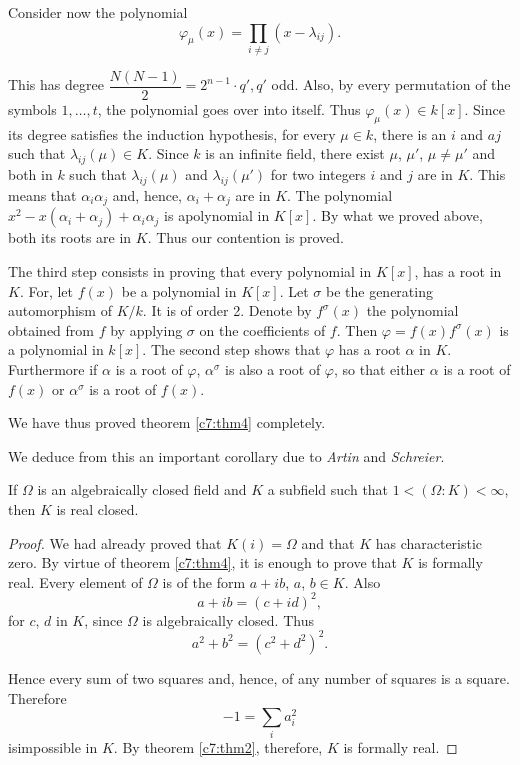 Consider now the polynomial
$$
\varphi_{\mu} (x) = \prod_{i \neq j} (x-\lambda_{ij}).
$$

This has degree $\dfrac{N(N-1)}{2} = 2^{n-1} \cdot q', q'$ odd. Also,
by every permutation of the symbols $1, \ldots, t$, the polynomial
goes over into itself. Thus $\varphi_{\mu}(x) \in k[x]$. Since its
degree satisfies the induction hypothesis, for every $\mu \in k$,
there is an $i$ and $aj$ such that $\lambda_{ij}(\mu) \in K$. Since
$k$ is an infinite field, there exist $\mu$, $\mu'$, $\mu \neq \mu'$
and both in $k$ such that $\lambda_{ij}(\mu)$ and $\lambda_{ij}(\mu')$
for two integers $i$ and $j$ are in $K$. This means that
$\alpha_i\alpha_j$ and, hence, $\alpha_i + \alpha_j$ are in $K$. The
polynomial $x^2-x(\alpha_i + \alpha_j) +\alpha_i \alpha_j$ is
a\pageoriginale polynomial in $K[x]$. By what we proved above, both
its roots are in $K$. Thus our contention is proved. 

The third step consists in proving that every polynomial in $K[x]$,
has a root in $K$. For, let $f(x)$ be a polynomial in $K[x]$. Let
$\sigma$ be the generating automorphism of $K/k$. It is of order
2. Denote by $f^{\sigma}(x)$ the polynomial obtained from $f$ by
applying $\sigma$ on the coefficients of $f$. Then $\varphi = f(x)
f^{\sigma}(x)$ is a polynomial in $k[x]$. The second step shows that
$\varphi$ has a root $\alpha$ in $K$. Furthermore if $\alpha$ is a
root of $\varphi$, $\alpha^{\sigma}$ is also a root of $\varphi$, so
that either $\alpha$ is a root of $f(x)$ or $\alpha^{\sigma}$ is a
root of $f(x)$.

We have thus proved theorem \ref{c7:thm4} completely.

We deduce from this an important corollary due to \textit{Artin} and\break
\textit{Schreier}. 



\setcounter{corollary}{0}
\begin{corollary}\label{c7:cor1}%
If $\Omega$ is an algebraically closed field and $K$ a subfield such
that $1<(\Omega:K)< \infty$, then $K$ is real closed.
\end{corollary}

\begin{proof}
We had already proved that $K(i) = \Omega$ and that $K$ has
characteristic zero. By virtue of theorem \ref{c7:thm4}, it is
enough to prove that $K$ is formally real. Every element of $\Omega$
is of the form $a+ib$, $a$, $b\in K$. Also 
$$
a + ib = (c+id)^2,
$$
for $c$, $d$ in $K$, since $\Omega$ is algebraically closed. Thus
$$
a^2+ b^2  = (c^2+d^2)^2.
$$

Hence every sum of two squares and, hence, of any number of squares is
a square. Therefore
$$
-1 = \sum_{i} a^2_i
$$
is\pageoriginale impossible in $K$. By theorem \ref{c7:thm2},
therefore, $K$ is formally real. 
\end{proof}

